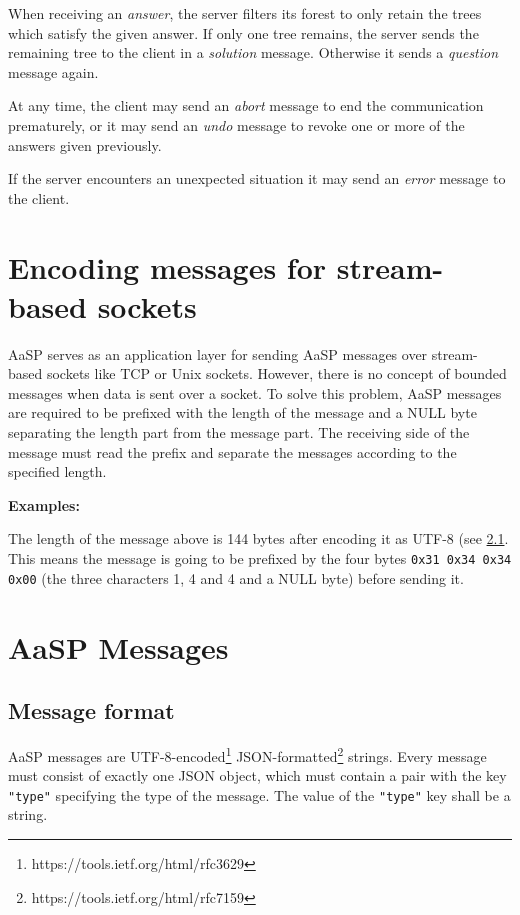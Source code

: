 \documentclass{scrartcl}
\newcommand{\messtype}[1]{\emph{#1}}
\newcommand{\jsstring}[1]{\texttt{\color{OrangeRed}"#1"}}
\newcommand{\Examples}{\noindent\textbf{Examples:}}
\newcommand{\bytes}[1]{\texttt{#1}}
\begin{document}
When receiving an \messtype{answer}, the server filters its forest to only retain the trees which satisfy the given answer.
If only one tree remains, the server sends the remaining tree to the client in a \messtype{solution} message.
Otherwise it sends a \messtype{question} message again.

At any time, the client may send an \messtype{abort} message to end the communication prematurely, or it may send an \messtype{undo} message to revoke one or more of the answers given previously.

If the server encounters an unexpected situation it may send an \messtype{error} message to the client.

\section{Encoding messages for stream-based sockets}
\label{sec:Encoding messages for stream-based sockets}

AaSP serves as an application layer for sending AaSP messages over stream-based sockets like TCP or Unix sockets.
However, there is no concept of bounded messages when data is sent over a socket.
To solve this problem, AaSP messages are required to be prefixed with the length of the message and a NULL byte separating the length part from the message part.
The receiving side of the message must read the prefix and separate the messages according to the specified length.

\Examples


The length of the message above is 144 bytes after encoding it as UTF-8 (see \ref{sub:Message format}.
This means the message is going to be prefixed by the four bytes \bytes{0x31 0x34 0x34 0x00} (the three characters 1, 4 and 4 and a NULL byte) before sending it.

\section{AaSP Messages}
\label{sec:AaSP Messages}

\subsection{Message format}
\label{sub:Message format}

AaSP messages are UTF-8-encoded\footnote{https://tools.ietf.org/html/rfc3629}
JSON-formatted\footnote{https://tools.ietf.org/html/rfc7159}
strings.
Every message must consist of exactly one JSON object, which must contain a pair with the key \jsstring{type} specifying the type of the message.
The value of the \jsstring{type} key shall be a string.
\end{document}
